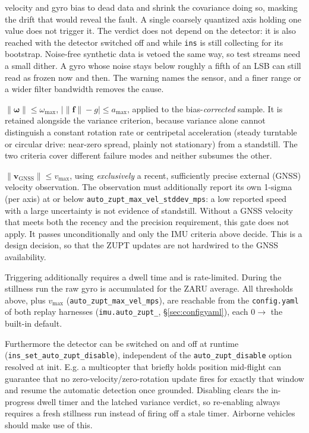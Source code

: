 \documentclass[11pt,a4paper]{article}
\newcommand{\vect}[1]{\bm{#1}}
\newcommand{\code}[1]{\texttt{#1}}
\begin{document}
\begin{description}
    velocity and gyro bias to dead data and shrink the covariance doing
    so, masking the drift that would reveal the fault. A single
    coarsely quantized axis holding one value does not trigger it.
    The verdict does not depend on the detector: it is also reached
    with the detector switched off and while \code{ins} is still
    collecting for its bootstrap. Noise-free synthetic data is vetoed
    the same way, so test streams need a small dither. A gyro whose
    noise stays below roughly a fifth of an LSB can still read as frozen
    now and then. The warning names the sensor, and a finer range or a
    wider filter bandwidth removes the cause.
  \item[Magnitude bounds.] $\|\vect{\omega}\| \le \omega_{\max}$,
    $\big|\|\vect{f}\| - g\big| \le a_{\max}$, applied to the
    bias-\emph{corrected} sample. It is retained alongside the variance
    criterion, because variance alone cannot distinguish a constant
    rotation rate or centripetal acceleration (steady turntable or
    circular drive: near-zero spread, plainly not stationary) from a
    standstill. The two criteria cover different failure modes and
    neither subsumes the other.
  \item[Velocity gate.] $\|\vect{v}_{\text{GNSS}}\| \le v_{\max}$,
    using \emph{exclusively} a recent, sufficiently precise external
    (GNSS) velocity observation. The observation must additionally report its own 1-sigma
    (per axis) at or below \code{auto\_\allowbreak{}zupt\_\allowbreak{}max\_\allowbreak{}vel\_\allowbreak{}stddev\_\allowbreak{}mps}: a
    low reported speed with a large uncertainty is not evidence of
    standstill. Without a GNSS velocity that meets both the recency and the
    precision requirement, this gate does not apply. It passes
    unconditionally and only the IMU criteria above decide. This is
    a design decision, so that the ZUPT updates are not hardwired
    to the GNSS availability.
\end{description}

Triggering additionally requires a dwell time and is rate-limited.
During the stillness run the raw gyro is accumulated for the ZARU
average. All thresholds above, plus $v_{\max}$
(\code{auto\_\allowbreak{}zupt\_\allowbreak{}max\_\allowbreak{}vel\_\allowbreak{}mps}), are reachable from the
\code{config.yaml} of both replay harnesses (\code{imu.auto\_\allowbreak{}zupt\_\allowbreak*},
\S\ref{sec:configyaml}), each $0 \to$ the built-in default.

Furthermore the detector can be switched on and off at runtime
(\code{ins\_\allowbreak{}set\_\allowbreak{}auto\_\allowbreak{}zupt\_\allowbreak{}disable}), independent of the
\code{auto\_\allowbreak{}zupt\_\allowbreak{}disable} option resolved at init. E.g. a
multicopter that briefly holds position mid-flight can guarantee that no
zero-velocity/zero-rotation update fires for exactly that window and
resume the automatic detection once grounded. Disabling clears the
in-progress dwell timer and the latched variance verdict, so
re-enabling always requires a fresh stillness run instead of firing
off a stale timer. Airborne vehicles should make use of this.
\end{document}
